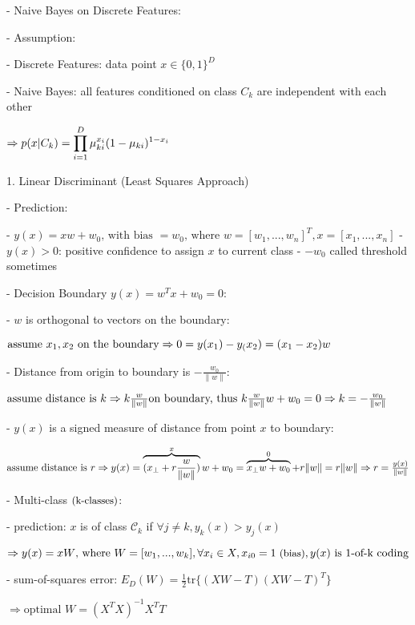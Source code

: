 - Naive Bayes on Discrete Features:

- Assumption:

- Discrete Features: data point $x\in\{0,1\}^D$ 

- Naive Bayes: all features conditioned on class $C_k$ are independent with each other

$\displaystyle \Rightarrow p(x|C_k)=\prod_{i=1}^D \mu_{ki}^{x_i} \space (1-\mu_{ki})^{1-x_i}$ 

1. Linear Discriminant (Least Squares Approach)

- Prediction:

- $y(x)=xw+w_0 \text{, with bias $=w_0$, where } w = [w_1,...,w_n]^T, x=[x_1,...,x_n]$ 
- $y(x)>0$: positive confidence to assign $x$ to current class 
- $-w_0$ called threshold sometimes

- Decision Boundary $y(x)=w^Tx+w_0=0$: 

- $w$ is orthogonal to vectors on the boundary:

	$\text{assume } x_1,x_2 \text{ on the boundary} \\ \Rightarrow 0=y(x_1) - y_(x_2)=(x_1-x_2)w$ 

- Distance from origin to boundary is $-\frac {w_0} {\|w\|}$: 

	$\text{assume distance is } k \\ \Rightarrow k \frac {w}{\|w\|} \text{on boundary, thus } k \frac {w}{\|w\|} w + w_0=0 \\ \Rightarrow k=-\frac {w_0}{\|w\|}$ 

- $y(x)$ is a signed measure of distance from point $x$ to boundary:

	$\text{assume distance is }r \\ \Rightarrow y(x)=\overbrace{(x_\perp+r \frac {w}{\|w\|})}^x w + w_0 = \overbrace{x_\perp w+w_0}^0 + r\|w\| = r\|w\| \\ \Rightarrow r = \frac{y(x)} {\|w\|}$ 

- Multi-class $\small\text{(k-classes)}$:

- prediction: $x$ is of class ${\mathcal C}_k$ if $\forall j \neq k, y_k(x) > y_j(x)$ 

$\Rightarrow y(x)=xW \text{, where } W=[w_1,...,w_k],\forall x_i \in X,x_{i0}=1 {\small\text{ (bias)}}, y(x) \text{ is 1-of-k coding} $ 

- sum-of-squares error: $E_D(W)=\frac 1 2 \text{tr}\{(XW-T)(XW-T)^T\}$ 

$\Rightarrow \text{optimal } W = (X^TX)^{-1}X^TT$ 

